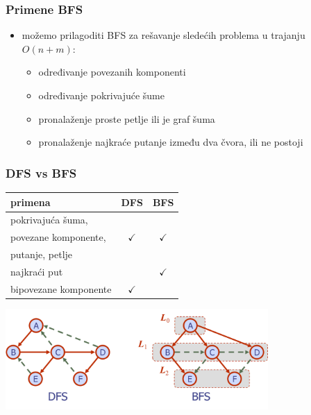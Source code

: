 \documentclass[compress,aspectratio=169]{beamer}
\begin{document}
\begin{frame}[fragile]
  \frametitle{Primene BFS}
  \begin{itemize}
    \item možemo prilagoditi BFS za rešavanje sledećih problema u 
      trajanju $O(n+m)$:
    \begin{itemize}
      \item određivanje povezanih komponenti
      \item određivanje pokrivajuće šume
      \item pronalaženje proste petlje ili je graf šuma
      \item pronalaženje najkraće putanje između dva čvora, ili ne 
        postoji
    \end{itemize}
  \end{itemize}
\end{frame}

\begin{frame}[fragile]
  \frametitle{DFS vs BFS}
  \begin{center}
    \begin{tabular}{l|c|c}
      \textbf{primena} & \textbf{DFS} & \textbf{BFS} \\ \hline
      pokrivajuća šuma, &  &  \\
      povezane komponente, & $\checkmark$ & $\checkmark$ \\
      putanje, petlje &  &  \\ \hline
      najkraći put &  & $\checkmark$ \\ \hline
      bipovezane komponente & $\checkmark$ & \\
    \end{tabular}
    \includegraphics[width=10cm]{asp-14-pic26.png}
  \end{center}
\end{frame}
\end{document}
